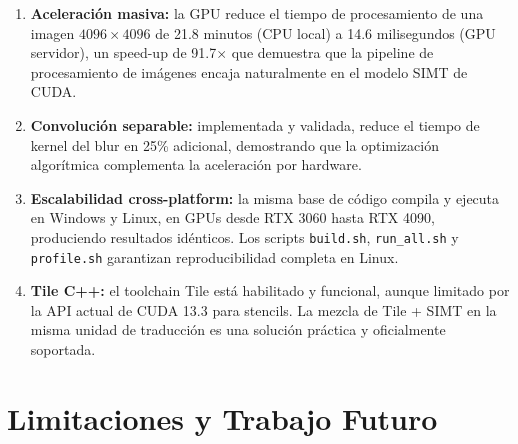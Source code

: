 \documentclass[12pt,a4paper]{article}
\begin{document}
\begin{enumerate}
  \item \textbf{Aceleraci\'on masiva:} la GPU reduce el tiempo de procesamiento de una imagen $4096 \times 4096$ de 21.8 minutos (CPU local) a 14.6 milisegundos (GPU servidor), un speed-up de 91.7$\times$ que demuestra que la pipeline de procesamiento de im\'agenes encaja naturalmente en el modelo SIMT de CUDA.
  \item \textbf{Convoluci\'on separable:} implementada y validada, reduce el tiempo de kernel del blur en 25\% adicional, demostrando que la optimizaci\'on algor\'itmica complementa la aceleraci\'on por hardware.
  \item \textbf{Escalabilidad cross-platform:} la misma base de c\'odigo compila y ejecuta en Windows y Linux, en GPUs desde RTX 3060 hasta RTX 4090, produciendo resultados id\'enticos. Los scripts \texttt{build.sh}, \texttt{run\_all.sh} y \texttt{profile.sh} garantizan reproducibilidad completa en Linux.
  \item \textbf{Tile C++:} el toolchain Tile est\'a habilitado y funcional, aunque limitado por la API actual de CUDA 13.3 para stencils. La mezcla de Tile + SIMT en la misma unidad de traducci\'on es una soluci\'on pr\'actica y oficialmente soportada.
\end{enumerate}

\section{Limitaciones y Trabajo Futuro}
\end{document}
